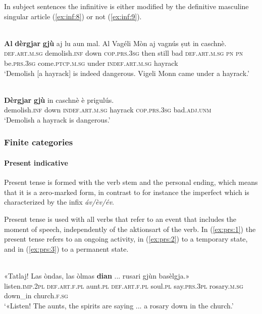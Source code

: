 In subject sentences the infinitive is either modified by the definitive masculine singular article (\ref{ex:inf:8}) or not (\ref{ex:inf:9}).
 
\ea
\label{ex:inf:8}
\\
\gll \textbf{Al} \textbf{dèrgjar} \textbf{gjù} aj lu aun mal. Al Vagéli Mòn aj vagnús ṣut in caschnè.\\
\textsc{def.art.m.sg} demolish.\textsc{inf} down \textsc{cop.prs.3sg} then still bad \textsc{def.art.m.sg} \textsc{pn} \textsc{pn} be.\textsc{prs.3sg} come.\textsc{ptcp.m.sg} under \textsc{indef.art.m.sg} hayrack\\
\glt `Demolish [a hayrack] is indeed dangerous. Vigeli Monn came under a hayrack.'
\z

\ea
\label{ex:inf:9}
\\
\gll \textbf{Dèrgjar} \textbf{gjù} in caschnè è prigulús.\\
demolish.\textsc{inf} down \textsc{indef.art.m.sg} hayrack \textsc{cop.prs.3sg} bad.\textsc{adj.unm}\\
\glt `Demolish a hayrack is dangerous.'
\z

\subsubsection{Finite categories}


\paragraph{Present indicative}
Present tense is formed with the verb stem and the personal ending, which means that it is a zero-marked form, in contrast to for instance the imperfect which is characterized by the infix \textit{áv/èv/év}.

Present tense is used with all verbs that refer to an event that includes the moment of speech, independently of the aktionsart of the verb. In (\ref{ex:prs:1}) the present tense refers to an ongoing activity, in (\ref{ex:prs:2}) to a temporary state, and in (\ref{ex:prs:3}) to a permanent state.
                     
\ea\label{ex:prs:1}
\\
\gll «Tatlaj! Las òndas, las òlmas \textbf{dian} ... rusari gjùn basèlgja.»  \\
listen.\textsc{imp.2pl} \textsc{def.art.f.pl} aunt.\textsc{pl} \textsc{def.art.f.pl} soul.\textsc{pl} say.\textsc{prs.3pl} {} rosary.\textsc{m.sg} down\_in church.\textsc{f.sg}\\
\glt `«Listen! The aunts, the spirits are saying ... a rosary down in the church.'
\z

